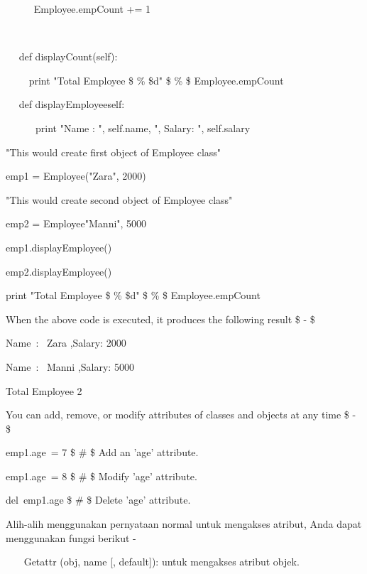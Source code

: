 \noindent 
~~~~~ Employee.empCount += 1 \par
\noindent 
~~  \par
\noindent 
~~ def displayCount(self): \par
\noindent 
~~~~ print "Total Employee  \$  \%  \$d"  \$  \%  \$ Employee.empCount \par
\vspace{12pt}
\noindent 
~~ def displayEmployee{self}: \par
\noindent 
~~~~~~print "Name : ", self.name,  ", Salary: ", self.salary \par
\vspace{12pt}
\noindent 
"This would create first object of Employee class" \par
\noindent 
emp1 = Employee("Zara", 2000) \par
\noindent 
"This would create second object of Employee class" \par
\noindent 
emp2 = Employee{"Manni", 5000} \par
\noindent 
emp1.displayEmployee() \par
\noindent 
emp2.displayEmployee() \par
\noindent 
print "Total Employee  \$  \% \$d"  \$  \%  \$ Employee.empCount \par
\noindent 
When the above code is executed, it produces the following result  \$ - \$ \par
\noindent 
Name~:~ Zara ,Salary:  2000 \par
\noindent 
Name~:~ Manni ,Salary:  5000 \par
\noindent 
Total Employee 2 \par
\noindent 
You can add, remove, or modify attributes of classes and objects at any time  \$ - \$ \par
\noindent 
emp1.age~= 7   \$  \#  \$ Add an 'age' attribute. \par
\noindent 
emp1.age~= 8   \$  \#  \$ Modify 'age' attribute. \par
\noindent 
del~emp1.age   \$  \#  \$ Delete 'age' attribute. \par
\vspace{12pt}
Alih-alih menggunakan pernyataan normal untuk mengakses atribut, Anda dapat menggunakan fungsi berikut - \par
\vspace{12pt}
\noindent 
~~~ Getattr (obj, name [, default]): untuk mengakses atribut objek. \par
\vspace{12pt}

